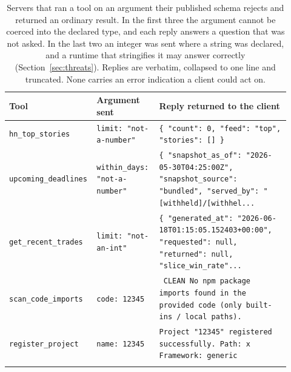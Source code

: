 \begin{table}[t]
\centering
\caption{Servers that ran a tool on an argument their published schema rejects
and returned an ordinary result. In the first three the argument cannot be
coerced into the declared type, and each reply answers a question that was not
asked. In the last two an integer was sent where a string was declared, and a
runtime that stringifies it may answer correctly (Section~\ref{sec:threats}).
Replies are verbatim, collapsed to one line and truncated. None carries an error
indication a client could act on.}
\label{tab:consequences}
\small
\begin{tabular}{p{0.24\linewidth}p{0.22\linewidth}p{0.46\linewidth}}
\toprule
Tool & Argument sent & Reply returned to the client \\
\midrule
\texttt{hn\_top\_stories} & \texttt{limit: "not-a-number"} & \texttt{\{ "count": 0, "feed": "top", "stories": [] \}} \\
\addlinespace
\texttt{upcoming\_deadlines} & \texttt{within\_days: "not-a-number"} & \texttt{\{ "snapshot\_as\_of": "2026-05-30T04:25:00Z", "snapshot\_source": "bundled", "served\_by": "[withheld]/[withhel...} \\
\addlinespace
\texttt{get\_recent\_trades} & \texttt{limit: "not-an-int"} & \texttt{\{ "generated\_at": "2026-06-18T01:15:05.152403+00:00", "requested": null, "returned": null, "slice\_win\_rate"...} \\
\addlinespace
\midrule
\texttt{scan\_code\_imports} & \texttt{code: 12345} & \texttt{ CLEAN  No npm package imports found in the provided code (only built-ins / local paths).} \\
\addlinespace
\texttt{register\_project} & \texttt{name: 12345} & \texttt{Project "12345" registered successfully. Path: x Framework: generic} \\
\addlinespace
\bottomrule
\end{tabular}
\end{table}
